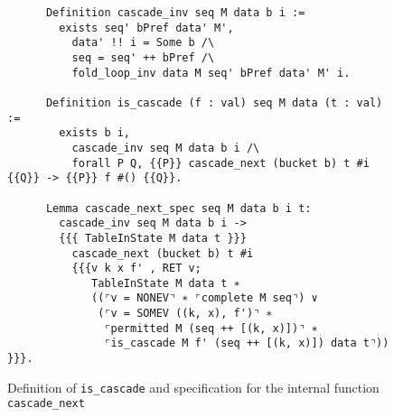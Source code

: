 \documentclass[10pt,a4paper]{article}
\begin{document}
\begin{figure}
\begin{verbatim}
      Definition cascade_inv seq M data b i :=
        exists seq' bPref data' M',
          data' !! i = Some b /\
          seq = seq' ++ bPref /\
          fold_loop_inv data M seq' bPref data' M' i.
                        
      Definition is_cascade (f : val) seq M data (t : val) :=
        exists b i,
          cascade_inv seq M data b i /\
          forall P Q, {{P}} cascade_next (bucket b) t #i {{Q}} -> {{P}} f #() {{Q}}.

      Lemma cascade_next_spec seq M data b i t:
        cascade_inv seq M data b i ->
        {{{ TableInState M data t }}}
          cascade_next (bucket b) t #i
          {{{v k x f' , RET v;
             TableInState M data t ∗
             ((⌜v = NONEV⌝ ∗ ⌜complete M seq⌝) ∨
              (⌜v = SOMEV ((k, x), f')⌝ ∗
               ⌜permitted M (seq ++ [(k, x)])⌝ ∗           
               ⌜is_cascade M f' (seq ++ [(k, x)]) data t⌝)) }}}.
\end{verbatim}
\caption{Definition of \texttt{is\_cascade} and specification for the internal function \texttt{cascade\_next}}
\label{fig:is_cascade}
\end{figure}
\end{document}
